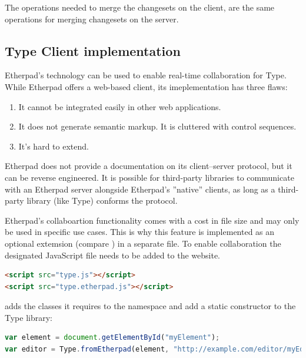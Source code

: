 The operations needed to merge the changesets on the client, are the same operations for merging changesets on the server.

\subsection{Type Client implementation}
\label{subsec:etherpad_type_client_implementation}

Etherpad's technology can be used to enable real-time collaboration for Type. While Etherpad offers a web-based client, its imeplementation has three flaws:

\begin{enumerate}
\item It cannot be integrated easily in other web applications.
\item It does not generate semantic markup. It is cluttered with control sequences.
\item It's hard to extend.
\end{enumerate}

Etherpad does not provide a documentation on its client--server protocol, but it can be reverse engineered. It is possible for third-party libraries to communicate with an Etherpad server alongside Etherpad's ''native'' clients, as long as a third-party library (like Type) conforms the protocol.

Etherpad's collaboartion functionality comes with a cost in file size and may only be used in specific use cases. This is why this feature is implemented as an optional extemsion (compare ) in a separate file. To enable collaboration the designated JavaScript file needs to be added to the website.

\begin{lstlisting}[language=html, caption=Enabling real-time collaboration to Type, label=lst:add_etherpad_html]
<script src="type.js"></script>
<script src="type.etherpad.js"></script>
\end{lstlisting}

 adds the classes it requires to the  namespace and add a static constructor to the Type library:

\begin{lstlisting}[language=JavaScript, caption=Factory method to generate a collaborative Type instance, label=lst:etherpad_constructor]
var element = document.getElementById("myElement");
var editor = Type.fromEtherpad(element, "http://example.com/editor/myEditorId");
\end{lstlisting}

